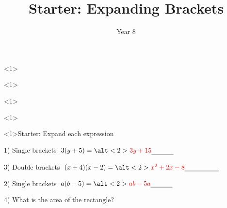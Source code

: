 \documentclass{beamer}
\title{Starter: Expanding Brackets}
\author{Year 8}
\date{}
\newcommand{\ablank}[1]{%
  \alt<2>{\textcolor{red}{#1}}{\underline{\phantom{#1}}}%
}
\newcommand{\ashow}[1]{\uncover<2->{\textcolor{red}{\small #1}}}
\newcommand{\ashowq}[1]{\alt<2->{\textcolor{red}{\small #1}}{?}}
\begin{document}
\begin{frame}<1>
  \titlepage
\end{frame}
\begin{frame}<1>
  \titlepage
\end{frame}
\begin{frame}<1>
  \titlepage
\end{frame}
\begin{frame}<1>
  \titlepage
\end{frame}

\begin{frame}<1>{Starter: Expand each expression}
\begin{minipage}[t]{0.48\textwidth}
  \begin{block}{1) Single brackets}
    \Large \(\;3(y+5)=\ablank{3y+15}\)
  \end{block}
  \vspace{0.5em}
  \begin{block}{3) Double brackets}
    \Large \(\;(x+4)(x-2)=\ablank{x^2+2x-8}\)
  \end{block}
\end{minipage}\hfill
\begin{minipage}[t]{0.48\textwidth}
  \begin{block}{2) Single brackets}
    \Large \(\; a(b-5)=\ablank{ab-5a}\)
  \end{block}
  \vspace{0.5em}
  \begin{block}{4) What is the area of the rectangle?}
    \par\vspace{0.5em}
    \ashow{Area = \(x(f+6)\)}
  \end{block}
\end{minipage}
\end{frame}
\end{document}
